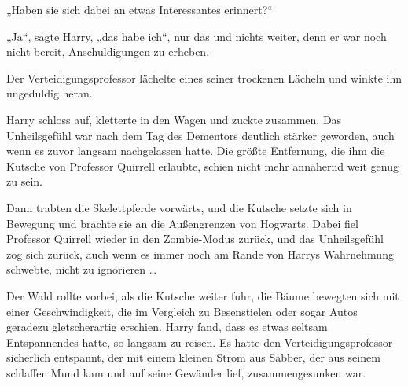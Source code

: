 „Haben sie sich dabei an etwas Interessantes erinnert?“

„Ja“, sagte Harry, „das habe ich“, nur das und nichts weiter, denn er war noch nicht bereit, Anschuldigungen zu erheben.

Der Verteidigungsprofessor lächelte eines seiner trockenen Lächeln und winkte ihn ungeduldig heran.

Harry schloss auf, kletterte in den Wagen und zuckte zusammen. Das Unheilsgefühl war nach dem Tag des Dementors deutlich stärker geworden, auch wenn es zuvor langsam nachgelassen hatte. Die größte Entfernung, die ihm die Kutsche von Professor Quirrell erlaubte, schien nicht mehr annähernd weit genug zu sein.

Dann trabten die Skelettpferde vorwärts, und die Kutsche setzte sich in Bewegung und brachte sie an die Außengrenzen von Hogwarts. Dabei fiel Professor Quirrell wieder in den Zombie-Modus zurück, und das Unheilsgefühl zog sich zurück, auch wenn es immer noch am Rande von Harrys Wahrnehmung schwebte, nicht zu ignorieren …

Der Wald rollte vorbei, als die Kutsche weiter fuhr, die Bäume bewegten sich mit einer Geschwindigkeit, die im Vergleich zu Besenstielen oder sogar Autos geradezu gletscherartig erschien. Harry fand, dass es etwas seltsam Entspannendes hatte, so langsam zu reisen. Es hatte den Verteidigungsprofessor sicherlich entspannt, der mit einem kleinen Strom aus Sabber, der aus seinem schlaffen Mund kam und auf seine Gewänder lief, zusammengesunken war.

